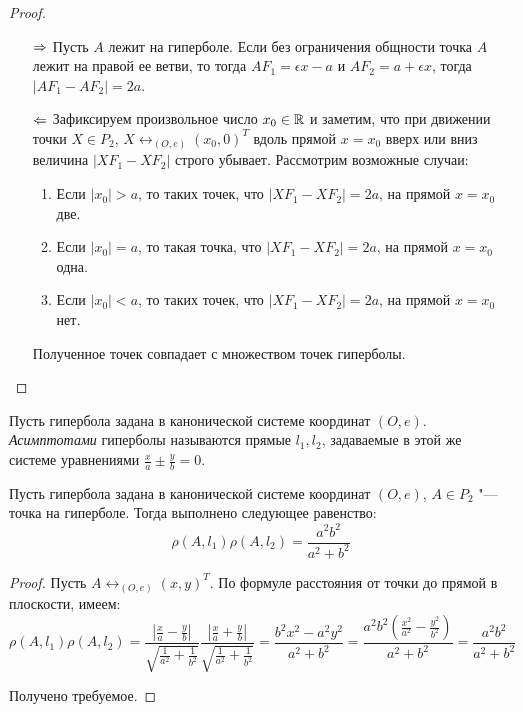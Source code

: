     \begin{proof}~
    	\begin{itemize}
    		\item[$\Rightarrow$] Пусть $A$ лежит на гиперболе. Если без ограничения общности точка $A$ лежит на правой ее ветви, то тогда $AF_1 = \epsilon x - a$ и $AF_2 = a + \epsilon x$, тогда $|AF_1 - AF_2| = 2a$.
    		
    		\item[$\Leftarrow$] Зафиксируем произвольное число $x_0 \in \mathbb{R}$ и заметим, что при движении точки $X \in P_2$, $X \leftrightarrow_{(O, e)} (x_0, 0)^T$ вдоль прямой $x = x_0$ вверх или вниз величина $|XF_1 - XF_2|$ строго убывает. Рассмотрим возможные случаи:
    		\begin{enumerate}
    			\item Если $|x_0| > a$, то таких точек, что $|XF_1 - XF_2| = 2a$, на прямой $x = x_0$ две.
    			\item Если $|x_0| = a$, то такая точка, что $|XF_1 - XF_2| = 2a$, на прямой $x = x_0$ одна.
    			\item Если $|x_0| < a$, то таких точек, что $|XF_1 - XF_2| = 2a$, на прямой $x = x_0$ нет.
    		\end{enumerate}
    		
    		Полученное точек совпадает с множеством точек гиперболы.\qedhere
    	\end{itemize}
    \end{proof}
    
    \begin{definition}
    	Пусть гипербола задана в канонической системе координат $(O, e)$. \textit{Асимптотами} гиперболы называются прямые $l_1, l_2$, задаваемые в этой же системе уравнениями $\frac{x}{a} \pm \frac{y}{b} = 0$.
    \end{definition}
    
    \begin{proposition}
    	Пусть гипербола задана в канонической системе координат $(O, e)$, $A \in P_2$ "--- точка на гиперболе. Тогда выполнено следующее равенство:
    	\[\rho(A, l_1)\rho(A, l_2) = \frac{a^2b^2}{a^2 + b^2}\]
    \end{proposition}
    
    \begin{proof}
    	Пусть $A \leftrightarrow_{(O, e)} (x, y)^T$. По формуле расстояния от точки до прямой в плоскости, имеем:
    	\[\rho(A, l_1)\rho(A, l_2) = \frac{\left|\frac{x}{a}-\frac{y}{b}\right|}{\sqrt{\frac{1}{a^2} + \frac{1}{b^2}}} 
    	\frac{\left|\frac{x}{a}+\frac{y}{b}\right|}{\sqrt{\frac{1}{a^2} + \frac{1}{b^2}}}
    	= \frac{b^2x^2 - a^2y^2}{a^2 + b^2} = \frac{a^2b^2\left(\frac{x^2}{a^2} - \frac{y^2}{b^2}\right)}{a^2 + b^2} = \frac{a^2b^2}{a^2 + b^2}\]
    	
    	Получено требуемое.
    \end{proof}
    
